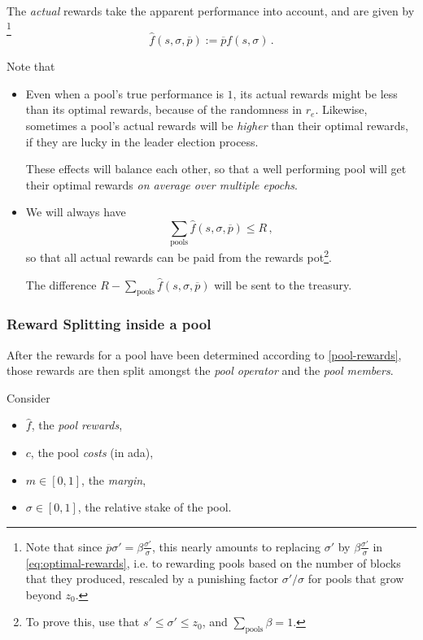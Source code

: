 \documentclass[11pt,a4paper]{article}
\newcommand\pbar{\overline{p}}
\begin{document}
The \emph{actual} rewards take the apparent performance into account, and are
given by
\footnote{
  Note that since
  \( \pbar\sigma' = \beta\tfrac{\sigma'}{\sigma}\), this nearly amounts to replacing
  \(\sigma'\) by \(\beta\tfrac{\sigma'}{\sigma}\) in \cref{eq:optimal-rewards}, i.e.
  to rewarding pools based on the number of blocks that they produced, rescaled
  by a punishing factor \(\sigma'/\sigma\) for pools that grow beyond \(z_0\).
}
\[
\hat{f}(s,\sigma,\pbar) := \pbar f(s, \sigma)
\,.
\]

Note that
\begin{itemize}
\item
  Even when a pool's true performance is \(1\), its actual rewards might be less
  than its optimal rewards, because of the randomness in \(r_e\). Likewise,
  sometimes a pool's actual rewards will be \emph{higher} than their optimal
  rewards, if they are lucky in the leader election process.

  These effects will balance each other, so that a well performing pool will get
  their optimal rewards \emph{on average over multiple epochs}.

\item
  We will always have
  \[ \sum_{\text{pools}} \hat{f}(s,\sigma,\pbar) \leq R \,, \]
  so that all actual rewards can be paid from the rewards pot\footnote{ To prove
    this, use that \(s' \leq \sigma' \leq z_0\), and
    \(\sum_{\text{pools}}\beta=1\).}.

  The difference \(R - \sum_{\text{pools}} \hat{f}(s,\sigma,\pbar)\) will be
  sent to the treasury.
\end{itemize}

\subsubsection{Reward Splitting inside a pool}
\label{reward-splitting-inside-a-pool}

After the rewards for a pool have been determined according to
\cref{pool-rewards}, those rewards are then split
amongst the \emph{pool operator} and the \emph{pool members}.

Consider

\begin{itemize}
\item
  \(\hat{f}\), the \emph{pool rewards},
\item
  \(c\), the pool \emph{costs} (in ada),
\item
  \(m\in[0,1]\), the \emph{margin},
\item
  \(\sigma\in[0,1]\), the relative stake of the pool.
\end{itemize}
\end{document}
